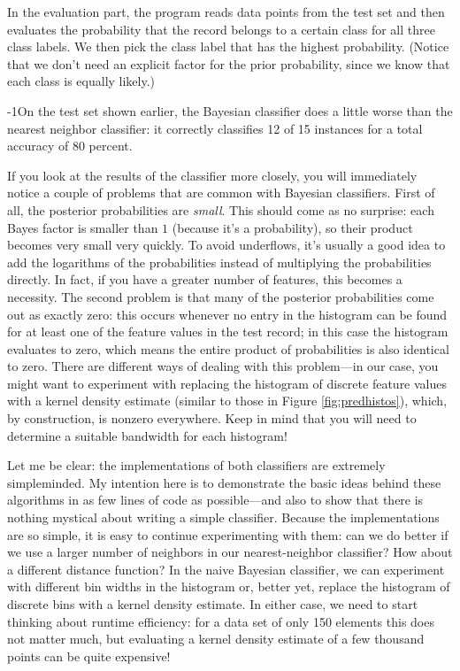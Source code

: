 In the evaluation part, the program reads data points from the test
set and then evaluates the probability that the record belongs to a
certain class for all three class labels. We then pick the class label
that has the highest probability. (Notice that we don't need an
explicit factor for the prior probability, since we know that each
class is equally likely.)

\looseness-1On the test set shown earlier, the Bayesian classifier does a little
worse than the nearest neighbor classifier: it correctly classifies 12
of 15 instances for a total accuracy of 80 percent.

If you look at the results of the classifier more closely, you will
immediately notice a couple of problems that are common with Bayesian
classifiers. First of all, the posterior probabilities are
\emph{small}.  This should come as no surprise: each Bayes factor is
smaller than $1$ (because it's a probability), so their product
becomes very small very quickly. To avoid underflows, it's usually a
good idea to add the logarithms of the probabilities instead of
multiplying the probabilities directly. In fact, if you have a greater
number of features, this becomes a necessity. The second problem is
that many of the posterior probabilities come out as exactly zero:
this occurs whenever no entry in the histogram can be found for at
least one of the feature values in the test record; in this case the
histogram evaluates to zero, which means the entire product of
probabilities is also identical to zero. There are different ways of
dealing with this problem---in our case, you might want to experiment
with replacing the histogram of discrete feature values with a kernel
density estimate (similar to those in Figure \ref{fig:predhistos}),
which, by construction, is nonzero everywhere. Keep in mind that you will need to
determine a suitable bandwidth for each histogram!

Let me be clear: the implementations of both classifiers are extremely
simpleminded. My intention here is to demonstrate the basic ideas
behind these algorithms in as few lines of code as possible---and also
to show that there is nothing mystical about writing a simple
classifier. Because the implementations are so simple, it is easy to
continue experimenting\vadjust{\pagebreak} with them: can we do better if we use a larger
number of neighbors in our nearest-\break neighbor classifier?  How about a
different distance function? In the naive Bayesian classifier, we can
experiment with different bin widths in the histogram or, better yet,
replace the histogram of discrete bins with a kernel density estimate.
In either case, we need to start thinking about runtime efficiency:
for a data set of only 150 elements this does not matter much, but
evaluating a kernel density estimate of a few thousand points can be
quite expensive!

